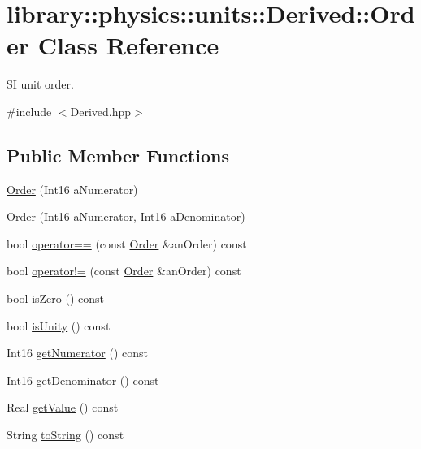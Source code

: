 \hypertarget{classlibrary_1_1physics_1_1units_1_1_derived_1_1_order}{}\section{library\+:\+:physics\+:\+:units\+:\+:Derived\+:\+:Order Class Reference}
\label{classlibrary_1_1physics_1_1units_1_1_derived_1_1_order}


SI unit order.  




{\ttfamily \#include $<$Derived.\+hpp$>$}

\subsection*{Public Member Functions}
\begin{DoxyCompactItemize}
\item 
\hyperlink{classlibrary_1_1physics_1_1units_1_1_derived_1_1_order_adf904bd5a124a6fa6b73e376fa6f94d4}{Order} (Int16 a\+Numerator)
\item 
\hyperlink{classlibrary_1_1physics_1_1units_1_1_derived_1_1_order_a9fc4a7af30cf5dc036ecfd77469d34ef}{Order} (Int16 a\+Numerator, Int16 a\+Denominator)
\item 
bool \hyperlink{classlibrary_1_1physics_1_1units_1_1_derived_1_1_order_a8ebf2f4e2d3248ca01d1baf78ce7cb65}{operator==} (const \hyperlink{classlibrary_1_1physics_1_1units_1_1_derived_1_1_order}{Order} \&an\+Order) const
\item 
bool \hyperlink{classlibrary_1_1physics_1_1units_1_1_derived_1_1_order_a378120863370ff30152cc49c7b6806c4}{operator!=} (const \hyperlink{classlibrary_1_1physics_1_1units_1_1_derived_1_1_order}{Order} \&an\+Order) const
\item 
bool \hyperlink{classlibrary_1_1physics_1_1units_1_1_derived_1_1_order_a29e8185533b5a0b2c1e15831f9f8d57b}{is\+Zero} () const
\item 
bool \hyperlink{classlibrary_1_1physics_1_1units_1_1_derived_1_1_order_a4b3063672bb65d3e601a65b38d50a9c9}{is\+Unity} () const
\item 
Int16 \hyperlink{classlibrary_1_1physics_1_1units_1_1_derived_1_1_order_a7dac73673a407c33a5de0bf91f531c31}{get\+Numerator} () const
\item 
Int16 \hyperlink{classlibrary_1_1physics_1_1units_1_1_derived_1_1_order_a36892a8b34b3e96c36b8df280f2cc285}{get\+Denominator} () const
\item 
Real \hyperlink{classlibrary_1_1physics_1_1units_1_1_derived_1_1_order_ad131603297e5a49bde057ee2a0caeacb}{get\+Value} () const
\item 
String \hyperlink{classlibrary_1_1physics_1_1units_1_1_derived_1_1_order_a8fd90d4af443c91824510a087d93a5b4}{to\+String} () const
\end{DoxyCompactItemize}
